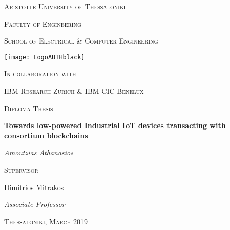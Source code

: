 \begin{titlepage}
	\centering
	{\scshape\Large Aristotle University of Thessaloniki \par}
	{\scshape\Large Faculty of Engineering \par}
    {\scshape\Large School of Electrical \& Computer Engineering \par}
	\vspace{0.5cm}
	\texttt{[image: LogoAUTHblack]} \par
	\vspace{1cm}
	{\scshape In collaboration with \par}
	\label{r}
	{\scshape\large IBM Research Zürich \& IBM CIC Benelux \par}
	\vspace{0.5cm}
	{\scshape\Large Diploma Thesis \par}
	\vspace{0.3cm}
	{\huge\bfseries Towards low-powered Industrial IoT devices transacting with consortium blockchains\par} 
	\vspace{2cm}
	{\Large\itshape Amoutzias Athanasios \par}
	\vfill
	{\scshape\large Supervisor \par}
	{\large Dimitrios Mitrakos \par}
	{\large \textit{Associate Professor}}
	\vfill
	
	\vfill
	{\scshape\large Thessaloniki, March 2019\par}
\end{titlepage}